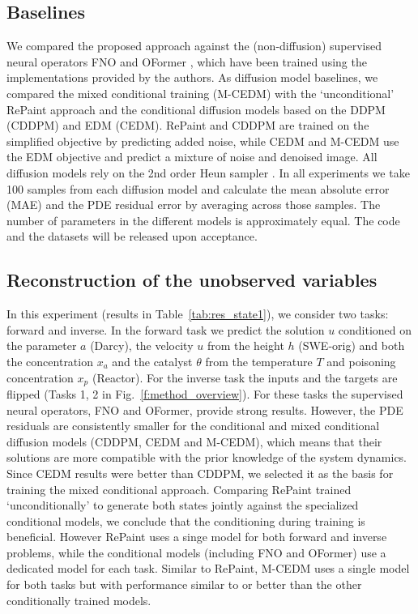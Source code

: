 \documentclass{article}
\newcommand{\xa}{x_a}
\newcommand{\xp}{x_p}
\newcommand{\cat}{\theta}
\begin{document}
\subsection{Baselines}
We compared the proposed approach against the (non-diffusion) supervised neural operators FNO \cite{li2021fourier} and OFormer \cite{li2023transformer}, which have been trained using the implementations provided by the authors.
As diffusion model baselines, we compared the mixed conditional training (M-CEDM) with the `unconditional' RePaint approach and the conditional diffusion models based on the DDPM (CDDPM) and EDM (CEDM). 
RePaint and CDDPM are trained on the simplified objective \cite{ho2020denoising} by predicting added noise, while CEDM and M-CEDM use the EDM objective \cite{karras2022elucidating} and predict a mixture of noise and denoised image. All diffusion models rely on the 2nd order Heun sampler \cite{karras2022elucidating}. In all experiments we take 100 samples from each diffusion model and calculate the mean absolute error (MAE) and the PDE residual error by averaging across those samples. The number of parameters in the different models is approximately equal. The code and the datasets will be released upon acceptance. 
  




\subsection{Reconstruction of the unobserved variables}
In this experiment (results in Table~\ref{tab:res_state1}), we consider two tasks: forward and inverse. In the forward task we predict the solution $u$ conditioned on the parameter $a$ (Darcy), the velocity $u$ from the height $h$ (SWE-orig) and both the concentration $\xa$ and the catalyst $\cat$ from the temperature $T$ and poisoning concentration $\xp$ (Reactor). For the inverse task the inputs and the targets are flipped (Tasks 1, 2 in Fig.~\ref{f:method_overview}). For these tasks the supervised neural operators, FNO and OFormer, provide strong results. However, the PDE residuals are consistently smaller for the conditional and mixed conditional diffusion models (CDDPM, CEDM and M-CEDM), which means that their solutions are more compatible with the prior knowledge of the system dynamics. Since CEDM results were better than CDDPM, we selected it as the basis for training the mixed conditional approach. Comparing RePaint trained `unconditionally' to generate both states jointly against the specialized conditional models, we conclude that the conditioning during training is beneficial. However RePaint uses a singe model for both forward and inverse problems, while the conditional models (including FNO and OFormer) use a dedicated model for each task. Similar to RePaint, M-CEDM uses a single model for both tasks but with performance similar to or better than the other conditionally trained models.
\end{document}
